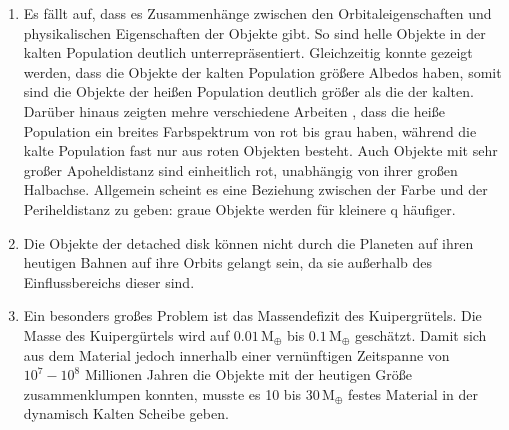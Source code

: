 \documentclass[12pt,a4paper,twoside]{article}
\newcommand{\ME}{\,\mathrm{M_\oplus}}
\begin{document}
\begin{enumerate}
\item Es fällt auf, dass es Zusammenhänge zwischen den Orbitaleigenschaften und physikalischen Eigenschaften der Objekte gibt. So sind helle Objekte in der kalten Population deutlich unterrepräsentiert\cite{Levison2001a}. Gleichzeitig konnte gezeigt werden, dass die Objekte der kalten Population größere Albedos haben, somit sind die Objekte der heißen Population deutlich größer als die der kalten\cite{Grundy2005}.
Darüber hinaus zeigten mehre verschiedene Arbeiten \cite{Tegler2000,Doressoundiram2001,Trujillo2002,Doressoundiram2005,Elliot2005,Levison2008}, dass die heiße Population ein breites Farbspektrum von rot bis grau haben, während die kalte Population fast nur aus roten Objekten besteht.
Auch Objekte mit sehr großer Apoheldistanz sind einheitlich rot, unabhängig von ihrer großen Halbachse.
Allgemein scheint es eine Beziehung zwischen der Farbe und der Periheldistanz zu geben: graue Objekte werden für kleinere q häufiger.
\item Die Objekte der detached disk können nicht durch die Planeten auf ihren heutigen Bahnen auf ihre Orbits gelangt sein, da sie außerhalb des Einflussbereichs dieser sind. %
\item Ein besonders großes Problem ist das Massendefizit des Kuipergrütels. Die Masse des Kuipergürtels wird auf $0.01 \ME$ bis $0.1 \ME$ geschätzt\cite{Gladman2001, Bernstein2004, Levison2008}.
Damit sich aus dem Material jedoch innerhalb einer vernünftigen Zeitspanne von $10^7-10^8$ Millionen Jahren die Objekte mit der heutigen Größe zusammenklumpen konnten, musste es 10 bis $30 \ME$ festes Material in der dynamisch Kalten Scheibe geben.\cite{Stern1996AJ, Stern1997AJ, Stern1997ApJ, Kenyon1998AJ, Kenyon1999AJ, Kenyon1999ApJ, Kenyon2004}
\end{enumerate} %
\end{document}
